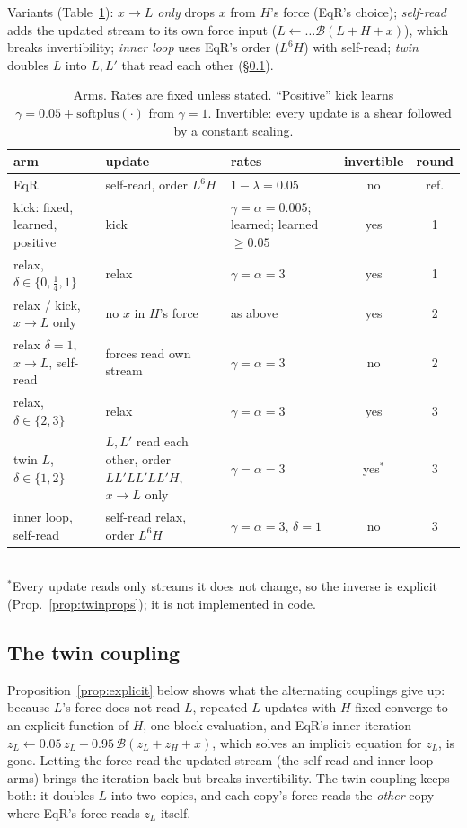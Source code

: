 \documentclass[11pt]{article}
\theoremstyle{definition}
\newcommand{\zH}{z_H}
\newcommand{\zL}{z_L}
\newcommand{\Bk}{\mathcal{B}}
\begin{document}
\noindent Variants (Table~\ref{tab:arms}): \emph{$x\to L$ only} drops $x$ from $H$'s force (EqR's choice); \emph{self-read} adds the updated
stream to its own force input ($L\leftarrow\dots\Bk(L+H+x)$), which breaks invertibility; \emph{inner loop} uses EqR's order
($L^6H$) with self-read; \emph{twin} doubles $L$ into $L,L'$ that read each other (\S\ref{sec:twindef}).

\begin{table}[t]
\centering\small
\caption{Arms. Rates are fixed unless stated. ``Positive'' kick learns $\gamma=0.05+\mathrm{softplus}(\cdot)$ from $\gamma=1$.
Invertible: every update is a shear followed by a constant scaling.}\label{tab:arms}
\begin{tabular}{@{}p{3.7cm}p{4.1cm}p{3.3cm}cc@{}}
\toprule
arm & update & rates & invertible & round \\
\midrule
EqR & self-read, order $L^6H$ & $1-\lambda=0.05$ & no & ref. \\
kick: fixed, learned, positive & kick & $\gamma{=}\alpha{=}0.005$; learned; learned $\ge0.05$ & yes & 1 \\
relax, $\delta\in\{0,\tfrac14,1\}$ & relax & $\gamma=\alpha=3$ & yes & 1 \\
relax / kick, $x\to L$ only & no $x$ in $H$'s force & as above & yes & 2 \\
relax $\delta{=}1$, $x\to L$, self-read & forces read own stream & $\gamma=\alpha=3$ & no & 2 \\
relax, $\delta\in\{2,3\}$ & relax & $\gamma=\alpha=3$ & yes & 3 \\
twin $L$, $\delta\in\{1,2\}$ & $L,L'$ read each other, order $LL'LL'LL'H$, $x\to L$ only & $\gamma=\alpha=3$ & yes$^\ast$ & 3 \\
inner loop, self-read & self-read relax, order $L^6H$ & $\gamma=\alpha=3$, $\delta=1$ & no & 3 \\
\bottomrule
\end{tabular}\\[2pt]
{\footnotesize $^\ast$Every update reads only streams it does not change, so the inverse is explicit (Prop.~\ref{prop:twinprops});
it is not implemented in code.}
\end{table}

\subsection{The twin coupling}\label{sec:twindef}

Proposition~\ref{prop:explicit} below shows what the alternating couplings give up: because $L$'s force does not read $L$, repeated $L$
updates with $H$ fixed converge to an explicit function of $H$, one block evaluation, and EqR's inner iteration
$\zL\leftarrow0.05\,\zL+0.95\,\Bk(\zL+\zH+x)$, which solves an implicit equation for $\zL$, is gone. Letting the force read the updated stream
(the self-read and inner-loop arms) brings the iteration back but breaks invertibility. The twin coupling keeps both: it doubles $L$ into
two copies, and each copy's force reads the \emph{other} copy where EqR's force reads $\zL$ itself.
\end{document}
